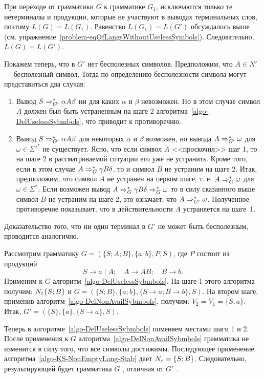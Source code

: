 \begin{myproof}
При переходе от грамматики $G$ к грамматике $G_1$, исключаются только те нетерминалы и продукции, которые не участвуют в выводах терминальных слов, поэтому $L(G)=L(G_1)$. Равенство $L(G_1)=L(G')$ обсуждалось выше (см. упражнение~\ref{problem-eqOfLangsWithoutUselessSymbols}). Следовательно, $L(G)=L(G')$.

Покажем теперь, что в $G'$ нет бесполезных символов. Предположим, что $A\in N'$ --- бесполезный символ. Тогда по определению бесполезности символа могут представиться два случая:

\begin{enumerate}
\item Вывод $S\Rightarrow_{G'}^*\alpha A\beta$ ни для каких $\alpha$ и $\beta$ невозможен. Но в этом случае символ $A$ должен был быть устраненным на шаге 2 алгоритма~\ref{algo-DelUselessSybmbols}, что приводит к противоречию.

\item Вывод $S\Rightarrow_{G'}^*\alpha A\beta$ для некоторых $\alpha$ и $\beta$ возможен, но вывода $A\Rightarrow_{G'}^*\omega$ для $\omega\in\Sigma'^*$ не существует. Ясно, что если символ $A$ <<проскочил>> шаг 1, то на шаге 2 в рассматриваемой ситуации его уже не устранить. Кроме того, если в этом случае $A\Rightarrow_G^*\gamma B\delta$, то и символ $B$ не устраним на шаге 2. Итак, предположим, что символ $A$ не устранен на первом шаге, т. е. $A\Rightarrow_G^*\omega$ для $\omega\in\Sigma^*$. Если возможен вывод $A\Rightarrow_G^*\gamma B\delta\Rightarrow_G^*\omega$ то в силу сказанного выше символ $B$ не устраним на шаге 2, это означает, что $A\Rightarrow_{G'}^*\omega$. Полученное противоречие показывает, что в действительности $A$ устраняется на шаге~1.
\end{enumerate}

Доказательство того, что ни один терминал в $G'$ не может быть бесполезным, проводится аналогично.
\end{myproof}

\begin{myexample}
\label{example-algosteps}
Рассмотрим грамматику $G=(\{S;A;B\},\{a:b\},P,S)$, где $P$ состоит из продукций
\[
S\to a \mid A; \quad A\to AB; \quad B\to b.
\]
Применим к $G$ алгоритм~\ref{algo-DelUselessSybmbols}. На шаге 1 этого алгоритма получим: $N_\varepsilon\{S;B\}$ и $G=(\{S;B\},\{a;b\},\{S\to a;B\to b\},S)$. На втором шаге, применив алгоритм~\ref{algo-DelNonAvailSybmbols}, получим: $V_2=V_1=\{S,a\}$. Итак, $G'=(\{S\},\{a\},\{S\to a\},S)$.

Теперь в алгоритме~\ref{algo-DelUselessSybmbols} поменяем местами шаги 1 и 2. После применения к $G$ алгоритма~\ref{algo-DelNonAvailSybmbols} грамматика не изменится в силу того, что все символы достижимы. Последующее применение алгоритма~\ref{algo-KS-NonEmptyLang-Stab} дает $N_\varepsilon=\{S;B\}$. Следовательно, результирующей будет грамматика $G$ , отличная от $G'$ .
\end{myexample}

